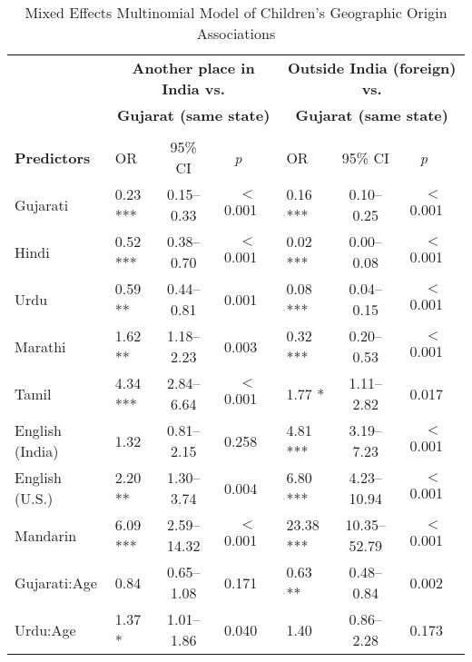 \begin{table*}[t]
\small
\caption{Mixed Effects Multinomial Model of Children's Geographic Origin Associations \label{tab:geomod}}
    \centering
    \vspace{5pt}
\begin{threeparttable}
\begin{tabular}{llcrclcrc}
 \toprule
  & \multicolumn{4}{c}{\textbf{Another place in India vs.}} & \multicolumn{4}{c}{\textbf{Outside India (foreign) vs.}}\\
 & \multicolumn{4}{c}{\textbf{Gujarat (same state)\tnote{a}}} & \multicolumn{4}{c}{\textbf{Gujarat (same state)\tnote{a}}}\\
\cline{2-4} \cline{6-8}\\[-.75em]
\textbf{Predictors} & {OR} & {95\% CI} & \multicolumn{1}{c}{\textit{p}} & & {OR} & {95\% CI} & \multicolumn{1}{c}{\textit{p}} & \\ 
\midrule

Gujarati & 0.23 *** & 0.15--0.33 & $<$0.001 & & 0.16 *** & 0.10--0.25 & $<$0.001 & \\ 

Hindi & 0.52 *** & 0.38--0.70 & $<$0.001 & & 0.02 *** & 0.00--0.08 & $<$0.001 &\\ 

Urdu & 0.59 ** & 0.44--0.81 & 0.001 & & 0.08 *** & 0.04--0.15 & $<$0.001 &\\ 

Marathi & 1.62 ** & 1.18--2.23 & 0.003 & & 0.32 *** & 0.20--0.53 & $<$0.001 & \\ 
  
Tamil & 4.34 *** & 2.84--6.64 & $<$0.001 & & 1.77 * & 1.11--2.82 & 0.017 &\\ 

English (India) & 1.32 & 0.81--2.15 & 0.258 &  & 4.81 *** & 3.19--7.23 & $<$0.001 &\\ 
  
English (U.S.) & 2.20 ** & 1.30--3.74 & 0.004 & & 6.80 *** & 4.23--10.94 & $<$0.001 &\\ 
  
Mandarin & 6.09 *** & 2.59--14.32 & $<$0.001 & & 23.38 *** & 10.35--52.79 & $<$0.001 &\\ 
  
Gujarati:Age\tnote{b} & 0.84 & 0.65--1.08 & 0.171 &  & 0.63 ** & 0.48--0.84 & 0.002 & \\ 

Urdu:Age\tnote{b} & 1.37 * & 1.01--1.86 & 0.040 & & 1.40 & 0.86--2.28 & 0.173 &  \\ 


\end{tabular}
\end{threeparttable}
\end{table*}
